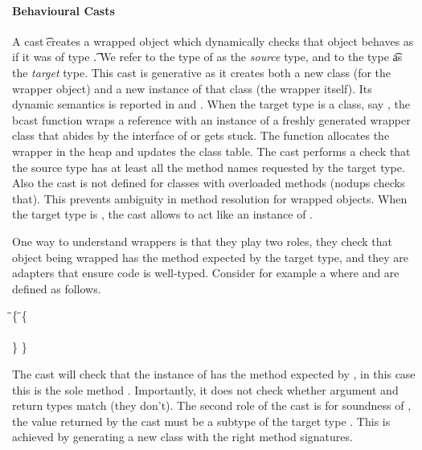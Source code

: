 \documentclass[acmlarge, anonymous, authordraft, review]{acmart} %
\begin{document}
\paragraph{Behavioural Casts}\label{p:behcast}
A cast \BehCast\t\a creates a wrapped object \ap which dynamically checks
that object \a behaves as if it was of type \t.  We refer to the type of \a
as the \emph{source} type, and to the type \t as the \emph{target} type.
This cast is generative as it creates both a new class (for the wrapper
object) and a new instance of that class (the wrapper itself). Its dynamic
semantics is reported in  and .  When the
target type is a class, say \Cp, the bcast function wraps a reference \a
with an instance of a freshly generated wrapper class \D that abides by the
interface of \Cp or gets stuck. The function allocates the wrapper in the
heap and updates the class table.  The cast performs a check that the source
type has at least all the method names requested by the target type.  Also
the cast is not defined for classes with overloaded methods (\textsf{nodups}
checks that).  This prevents ambiguity in method resolution for wrapped
objects. When the target type is \any, the cast allows \a to act like an
instance of \any.

One way to understand wrappers is that they play two roles, they check that
object being wrapped has the method expected by the target type, and they
are adapters that ensure \kafka code is well-typed. Consider for example
a \EM{\BehCast\D\New\C{}} where \C and \D are defined as follows.

\begin{tabbing}
\hspace{1cm}\= \class\= \C \{    \hspace{3cm}\=  \class\=  \D \{\\
   \>  \> \Mdef\m\x\any\any\x   \>        \>  \Mdef\m\x\D\D\x\\
   \>  \}  \> \>                         \}
\end{tabbing}

\noindent
The cast will check that the instance of \C has the method expected by \D,
in this case this is the sole method \m.  Importantly, it does not check
whether argument and return types match (they don't). The second role of the
cast is for soundness of \kafka, the value returned by the cast must be a
subtype of the target type \D. This is achieved by generating a new class
with the right method signatures.
\end{document}
